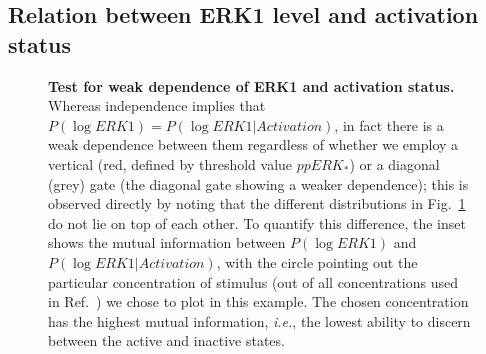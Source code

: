 \documentclass[11pt,a4paper,draft]{article}
\begin{document}
\subsection*{Relation between ERK1 level and activation status}
\begin{figure}[!htb]
 \centering
  \caption{{\bf Test for weak dependence of ERK1 and activation status.} Whereas independence implies that $P(\log ERK1) = P(\log ERK1 \vert Activation)$, in fact there is a weak dependence between them regardless of whether we employ a vertical (red, defined by threshold value $ppERK_*$) or a diagonal (grey) gate (the diagonal gate showing a weaker dependence); this is observed directly by noting that the different distributions in Fig.~\ref{S1_Fig} do not lie on top of each other. To quantify this difference, the inset shows the mutual information between $P(\log ERK1)$ and $P(\log ERK1 | Activation)$, with the circle pointing out the particular concentration of stimulus (out of all concentrations used in Ref.~\cite{Feinerman2008}) we chose to plot in this example. The chosen concentration has the highest mutual information, {\it i.e.}, the lowest ability to discern between the active and inactive states.}
  \label{S1_Fig}
\end{figure}
\end{document}
